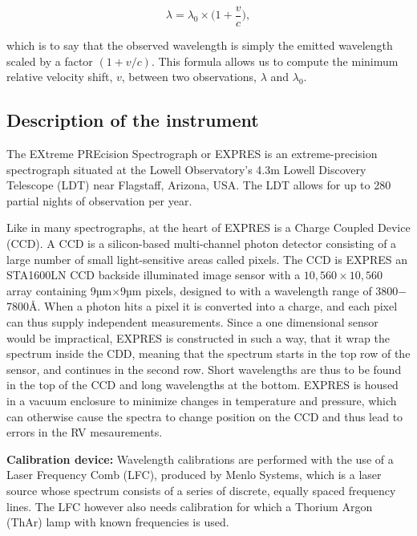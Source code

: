 \begin{equation}
    \label{eq:our_doppler}
    \lambda = \lambda_0 \times \Big(1 + \frac{v}{c} \Big),
\end{equation}

which is to say that the observed wavelength is simply the emitted wavelength scaled by a factor $(1 + v/c)$. This formula allows us to compute the minimum relative velocity shift, $v$, between two observations, $\lambda$ and $\lambda_0$.


\subsection{Description of the instrument}
The EXtreme PREcision Spectrograph or EXPRES is an extreme-precision spectrograph situated at the Lowell Observatory's 4.3m Lowell Discovery Telescope (LDT) near Flagstaff, Arizona, USA. The LDT allows for up to 280 partial nights of observation per year.

Like in many spectrographs, at the heart of EXPRES is a Charge Coupled Device (CCD). A CCD is a silicon-based multi-channel photon detector consisting of a large number of small light-sensitive areas called pixels. The CCD is EXPRES an STA1600LN CCD backside illuminated image sensor with a $10,560 \times 10,560$ array containing 9µm$\times$9µm pixels, designed to with a wavelength range of 3800$-$7800Å. When a photon hits a pixel it is converted into a charge, and each pixel can thus supply independent measurements. Since a one dimensional sensor would be impractical, EXPRES is constructed in such a way, that it wrap the spectrum inside the CDD, meaning that the spectrum starts in the top row of the sensor, and continues in the second row. Short wavelengths are thus to be found in the top of the CCD and long wavelengths at the bottom.
EXPRES is housed in a vacuum enclosure to minimize changes in temperature and pressure, which can otherwise cause the spectra to change position on the CCD and thus lead to errors in the RV mesaurements. 

\bigbreak
\noindent\textbf{Calibration device:}
Wavelength calibrations are performed with the use of a Laser Frequency Comb 
(LFC), produced by Menlo Systems, which is a laser source whose spectrum consists of a series of discrete, equally spaced frequency lines. The LFC however also needs calibration for which a Thorium Argon (ThAr) lamp with known frequencies is used.

